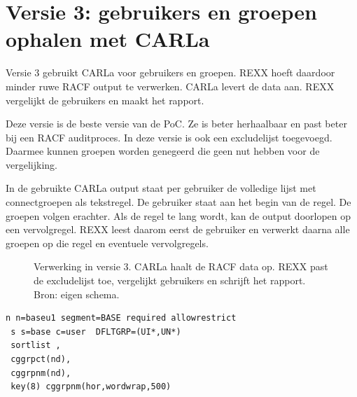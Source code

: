 \section{Versie 3: gebruikers en groepen ophalen met CARLa}

Versie 3 gebruikt CARLa voor gebruikers en groepen. REXX hoeft daardoor minder ruwe RACF output te verwerken. CARLa levert de data aan. REXX vergelijkt de gebruikers en maakt het rapport.

Deze versie is de beste versie van de PoC. Ze is beter herhaalbaar en past beter bij een RACF auditproces. In deze versie is ook een excludelijst toegevoegd. Daarmee kunnen groepen worden genegeerd die geen nut hebben voor de vergelijking.

In de gebruikte CARLa output staat per gebruiker de volledige lijst met connectgroepen als tekstregel. De gebruiker staat aan het begin van de regel. De groepen volgen erachter. Als de regel te lang wordt, kan de output doorlopen op een vervolgregel. REXX leest daarom eerst de gebruiker en verwerkt daarna alle groepen op die regel en eventuele vervolgregels.

\begin{figure}[htbp]
	\centering
	\caption[Verwerking in versie 3]{Verwerking in versie 3. CARLa haalt de RACF data op. REXX past de excludelijst toe, vergelijkt gebruikers en schrijft het rapport. Bron: eigen schema.}
	\label{fig:verwerking-versie-3}
\end{figure}

\begin{listing}[htbp]
\begin{verbatim}
n n=baseu1 segment=BASE required allowrestrict
 s s=base c=user  DFLTGRP=(UI*,UN*)
 sortlist ,
 cggrpct(nd),
 cggrpnm(nd),
 key(8) cggrpnm(hor,wordwrap,500)
\end{verbatim}
\caption[Versie 3: CARLa haalt connectgroepen op]{Fragment uit versie 3: CARLa schrijft per gebruiker de connectgroepen weg met \texttt{cggrpnm}. Bron: eigen PoC-scriptbestand \texttt{VERSIE\_3.txt}.}
\label{lst:v3-carla-cggrpnm}
\end{listing}

